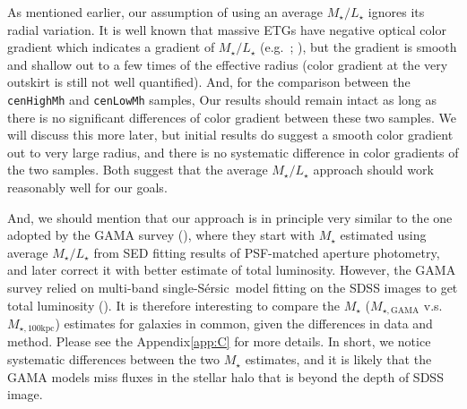 \documentclass{emulateapj}
\def\ser{{S\'{e}rsic\ }}
\def\rbcg{\texttt{cenHighMh}}
\def\nbcg{\texttt{cenLowMh}}
\def\mstar{{$M_{\star}$}}
\def\mtot{{$M_{\star,100\mathrm{kpc}}$}}
\def\mgama{{$M_{\star,\mathrm{GAMA}}$}}
\def\m2l{{$M_{\star}/L_{\star}$}}
\begin{document}
\begin{CJK*}{UTF8}{gbsn}
    As mentioned earlier, our assumption of using an average \m2l{} ignores its
    radial variation.   
    It is well known that massive ETGs have negative optical color gradient which 
    indicates a gradient of \m2l{} (e.g.\ \citealt{LaBarbera2012}; \citealt{DSouza2015}),
    but the gradient is smooth and shallow out to a few times of the effective 
    radius (color gradient at the very outskirt is still not well quantified). 
    And, for the comparison between the \rbcg{} and \nbcg{} samples, 
    Our results should remain intact as long as there is no significant
    differences of color gradient between these two samples.
    We will discuss this more later, but initial results do suggest a smooth color
    gradient out to very large radius, and there is no systematic difference in 
    color gradients of the two samples.  
    Both suggest that the average \m2l{} approach should work reasonably well for
    our goals.
    
    And, we should mention that our approach is in principle very similar to the 
    one adopted by the GAMA survey (\citealt{Taylor2011}), where they start with 
    \mstar{} estimated using average \m2l{} from SED fitting results of
    PSF-matched aperture photometry, and later correct it with better estimate 
    of total luminosity.  
    However, the GAMA survey relied on multi-band single-\ser model fitting on 
    the SDSS images to get total luminosity (\citealt{Kelvin2012}). 
    It is therefore interesting to compare the \mstar{} (\mgama{} v.s. \mtot{})
    estimates for galaxies in common, given the differences in data and method. 
    Please see the Appendix\ref{app:C} for more details. 
    In short, we notice systematic differences between the two \mstar{} estimates, 
    and it is likely that the GAMA models miss fluxes in the stellar halo that 
    is beyond the depth of SDSS image.  


\end{CJK*}
\end{document}
